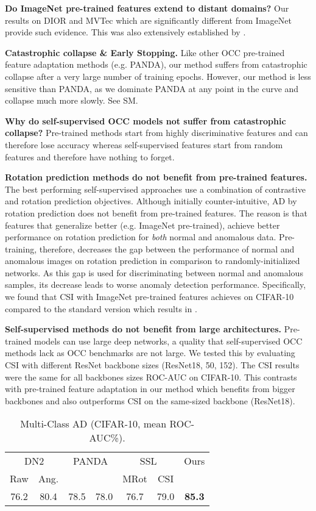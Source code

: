 \documentclass[letterpaper]{article} \usepackage{aaai23}  \usepackage{times}  \usepackage{helvet}  \usepackage{courier}  \usepackage[hyphens]{url}  \usepackage{graphicx} \usepackage{amsmath, amssymb}
\begin{document}
\textbf{Do ImageNet pre-trained features extend to distant domains?} Our results on DIOR and MVTec which are significantly different from ImageNet provide such evidence. This was also extensively established by \cite{reiss2021panda}. 

\textbf{Catastrophic collapse \& Early Stopping.} Like other OCC pre-trained feature adaptation methods (e.g. PANDA), our method suffers from catastrophic collapse after a very large number of training epochs. However, our method is less sensitive than PANDA, as we dominate PANDA at any point in the curve and collapse much more slowly. See SM.

\textbf{Why do self-supervised OCC models not suffer from catastrophic collapse?} Pre-trained methods start from highly discriminative features and can therefore lose accuracy whereas self-supervised features start from random features and therefore have nothing to forget.


\textbf{Rotation prediction methods do not benefit from pre-trained features.} The best performing self-supervised approaches \cite{tack2020csi,sohn2020learning} use a combination of contrastive and rotation prediction objectives. Although initially counter-intuitive, AD by rotation prediction does not benefit from pre-trained features. The reason is that features that generalize better (e.g. ImageNet pre-trained), achieve better performance on rotation prediction for \textit{both} normal and anomalous data. Pre-training, therefore, decreases the gap between the performance of normal and anomalous images on rotation prediction in comparison to randomly-initialized networks. As this gap is used for discriminating between normal and anomalous samples, its decrease leads to worse anomaly detection performance. Specifically, we found that CSI with ImageNet pre-trained features achieves  on CIFAR-10 compared to the standard version which results in .


\textbf{Self-supervised methods do not benefit from large architectures.} Pre-trained models can use large deep networks, a quality that self-supervised OCC methods lack as OCC benchmarks are not large. We tested this by evaluating CSI with different ResNet backbone sizes (ResNet18, 50, 152). The CSI results were the same for all backbones sizes  ROC-AUC on CIFAR-10. This contrasts with pre-trained feature adaptation in our method which benefits from bigger backbones and also outperforms CSI on the same-sized backbone (ResNet18).

\begin{table}[t]
  \centering
  \begin{tabular}{ccccccc}
    \toprule
 \multicolumn{2}{c}{DN2}	&	\multicolumn{2}{c}{PANDA} 	&	\multicolumn{2}{c}{SSL}	&	Ours \\
 \cmidrule(r){1-2} \cmidrule(r){3-4} \cmidrule(r){5-6} \cmidrule(r){7-7}
Raw & Ang. &  &  & MRot & CSI &  \\
\midrule
 76.2	&	80.4	&	78.5	& 78.0  &	 76.7	& 79.0 &	\textbf{85.3}	\\											
    \bottomrule
  \end{tabular}
\caption{Multi-Class AD (CIFAR-10, mean ROC-AUC\%).}
\label{tab:multi-modal}
\end{table}
\end{document}
